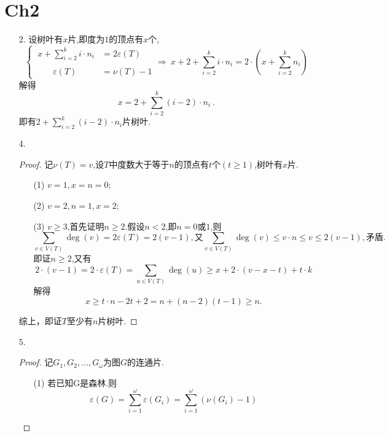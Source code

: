 \documentclass{article}
\begin{document}
\section*{Ch2}
\begin{enumerate}
    \item [2.]设树叶有$x$片,即度为$1$的顶点有$x$个,
    \[
        \begin{cases}
            \ x+\sum\limits_{i=2}^{k} i\cdot n_i&=2\varepsilon(T)\\
            & \\
            \qquad \varepsilon(T)&=\nu (T)-1
        \end{cases}
        \Rightarrow\ 
        x+2+\sum\limits_{i=2}^{k} i\cdot n_i =2\cdot \left(x+\sum\limits_{i=2}^{k} n_i\right)
    \]
    解得
    \[
        x=2+\sum\limits_{i=2}^{k} (i-2)\cdot n_i\ .
    \]
    即有$2+\sum\limits_{i=2}^{k} (i-2)\cdot n_i$片树叶.
    \item [4.]\begin{proof}
        记$\nu (T)=v$,设$T$中度数大于等于$n$的顶点有$t$个$(t\geqslant 1)$,树叶有$x$片.
        \begin{enumerate}
            \item [(1)]$v=1,x=n=0$;
            \item [(2)]$v=2,n=1,x=2$;
            \item [(3)]$v\geqslant 3$,首先证明$n\geqslant 2$.假设$n<2$,即$n=0\mbox{或}1$,则
            \[
                \sum\limits_{v\in V(T)} \deg(v)=2\varepsilon\left(T\right)=2(v-1),\mbox{又}\sum\limits_{v\in V(T)} \deg(v) \leqslant v\cdot n\leqslant v\leqslant 2(v-1),\mbox{矛盾}.
            \]
            即证$n\geqslant 2$,又有
            \[
                2\cdot(v-1)=2\cdot\varepsilon\left(T\right)=\sum\limits_{u\in V(T)} \deg(u)\geqslant x+2\cdot(v-x-t)+t\cdot k
            \]
            解得
            \[
                x\geqslant t\cdot n-2t+2=n+(n-2)(t-1)\geqslant n.
            \]
        \end{enumerate}
        综上，即证$T$至少有$n$片树叶.
    \end{proof}
    \item [5.]\begin{proof}记$G_1,G_2,\dots,G_\omega$为图$G$的连通片.
        \begin{enumerate}
            \item [(1)]若已知G是森林.则
            \[
                \varepsilon\left(G\right)
                =\sum\limits_{i=1}^{\omega} \varepsilon\left(G_{i}\right)
                =\sum\limits_{i=1}^{\omega} \left(\nu\left(G_{i}\right)-1 \right)
\]
\end{enumerate}
\end{proof}
\end{enumerate}
\end{document}
